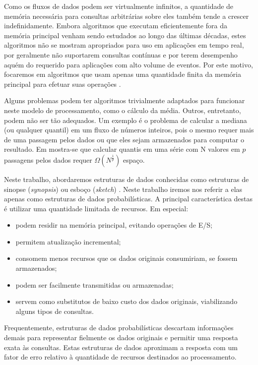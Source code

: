 Como os fluxos de dados podem ser virtualmente infinitos, a quantidade de memória necessária para consultas arbitrárias sobre eles também tende a crescer indefinidamente. Embora algoritmos que executam eficientemente fora da memória principal venham sendo estudados ao longo das últimas décadas, estes algoritmos não se mostram apropriados para uso em aplicações em tempo real, por geralmente não suportarem consultas contínuas e por terem desempenho aquém do requerido para aplicações com alto volume de eventos. Por este motivo, focaremos em algoritmos que usam apenas uma quantidade finita da memória principal para efetuar suas operações \cite{alon1996space}.

Alguns problemas podem ter algoritmos trivialmente adaptados para funcionar neste modelo de processamento, como o cálculo da média. Outros, entretanto, podem não ser tão adequados. Um exemplo é o problema de calcular a mediana (ou qualquer quantil) em um fluxo de números inteiros, pois o mesmo requer mais de uma passagem pelos dados ou que eles sejam armazenados para computar o resultado. Em \cite{munro1980selection} mostra-se que calcular quantis em uma série com N valores em $p$ passagens pelos dados requer $\Omega(N^{\frac{1}{p}})$ espaço.

Neste trabalho, abordaremos estruturas de dados conhecidas como estruturas de sinopse (\emph{synopsis}) ou esboço (\emph{sketch}) \cite{gibbons1999synopsis}. Neste trabalho iremos nos referir a elas apenas como estruturas de dados probabilísticas. A principal característica destas é utilizar uma quantidade limitada de recursos. Em especial:

\begin{itemize}
  \item podem residir na memória principal, evitando operações de E/S;
  \item permitem atualização incremental;
  \item consomem menos recursos que os dados originais consumiriam, se fossem armazenados;
  \item podem ser facilmente transmitidas ou armazenadas;
  \item servem como substitutos de baixo custo dos dados originais, viabilizando alguns tipos de consultas.
\end{itemize}

Frequentemente, estruturas de dados probabilísticas descartam informações demais para representar fielmente os dados originais e permitir uma resposta exata às consultas. Estas estruturas de dados aproximam a resposta com um fator de erro relativo à quantidade de recursos destinados ao processamento.

